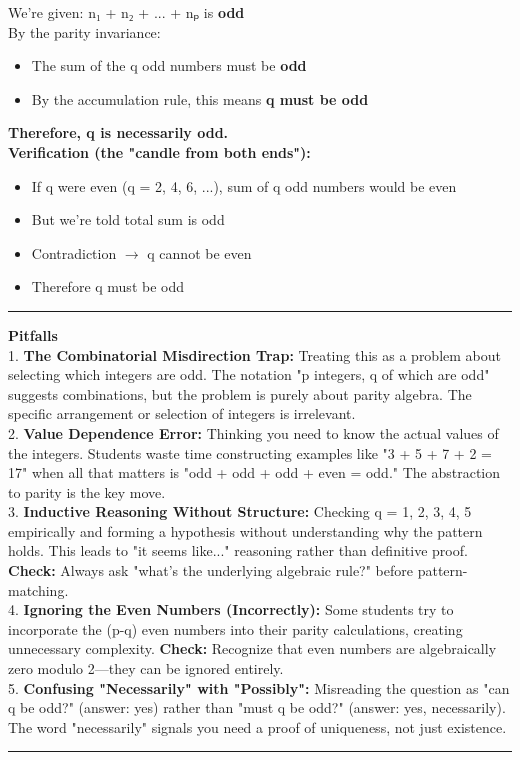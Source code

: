 \documentclass{article}
\begin{document}
We're given: n₁ + n₂ + ... + nₚ is \textbf{odd} \\
By the parity invariance:
\begin{itemize}
    \item The sum of the q odd numbers must be \textbf{odd}
    \item By the accumulation rule, this means \textbf{q must be odd}
\end{itemize}
\textbf{Therefore, q is necessarily odd.} \\
\textbf{Verification (the "candle from both ends"):}
\begin{itemize}
    \item If q were even (q = 2, 4, 6, ...), sum of q odd numbers would be even
    \item But we're told total sum is odd
    \item Contradiction $\to$ q cannot be even
    \item Therefore q must be odd \checkmark
\end{itemize}
\noindent \rule{\textwidth}{0.4pt}

\noindent \textbf{Pitfalls} \\
1. \textbf{The Combinatorial Misdirection Trap:} Treating this as a problem about selecting which integers are odd. The notation "p integers, q of which are odd" suggests combinations, but the problem is purely about parity algebra. The specific arrangement or selection of integers is irrelevant. \\
2. \textbf{Value Dependence Error:} Thinking you need to know the actual values of the integers. Students waste time constructing examples like "3 + 5 + 7 + 2 = 17" when all that matters is "odd + odd + odd + even = odd." The abstraction to parity is the key move. \\
3. \textbf{Inductive Reasoning Without Structure:} Checking q = 1, 2, 3, 4, 5 empirically and forming a hypothesis without understanding why the pattern holds. This leads to "it seems like..." reasoning rather than definitive proof. \textbf{Check:} Always ask "what's the underlying algebraic rule?" before pattern-matching. \\
4. \textbf{Ignoring the Even Numbers (Incorrectly):} Some students try to incorporate the (p-q) even numbers into their parity calculations, creating unnecessary complexity. \textbf{Check:} Recognize that even numbers are algebraically zero modulo 2—they can be ignored entirely. \\
5. \textbf{Confusing "Necessarily" with "Possibly":} Misreading the question as "can q be odd?" (answer: yes) rather than "must q be odd?" (answer: yes, necessarily). The word "necessarily" signals you need a proof of uniqueness, not just existence. \\
\noindent \rule{\textwidth}{0.4pt}
\end{document}
